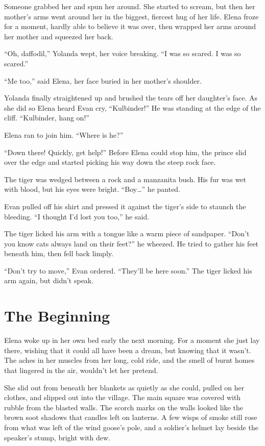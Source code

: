 \documentclass[10pt]{book}
\begin{document}
Someone grabbed her and spun her around. She started to scream, but then her mother's arms went around her in the biggest, fiercest hug of her life. Elena froze for a moment, hardly able to believe it was over, then wrapped her arms around her mother and squeezed her back.

``Oh, daffodil,'' Yolanda wept, her voice breaking. ``I was so scared. I was so scared.''

``Me too,'' said Elena, her face buried in her mother's shoulder.

Yolanda finally straightened up and brushed the tears off her daughter's face. As she did so Elena heard Evan cry, ``Kulbinder!'' He was standing at the edge of the cliff. ``Kulbinder, hang on!''

Elena ran to join him. ``Where is he?''

``Down there! Quickly, get help!'' Before Elena could stop him, the prince slid over the edge and started picking his way down the steep rock face.

The tiger was wedged between a rock and a manzanita bush. His fur was wet with blood, but his eyes were bright. ``Boy{\ldots}'' he panted.

Evan pulled off his shirt and pressed it against the tiger's side to staunch the bleeding. ``I thought I'd lost you too,'' he said.

The tiger licked his arm with a tongue like a warm piece of sandpaper. ``Don't you know cats always land on their feet?'' he wheezed. He tried to gather his feet beneath him, then fell back limply.

``Don't try to move,'' Evan ordered. ``They'll be here soon.'' The tiger licked his arm again, but didn't speak.

\chapter{The Beginning}

Elena woke up in her own bed early the next morning. For a moment she just lay there, wishing that it could all have been a dream, but knowing that it wasn't. The aches in her muscles from her long, cold ride, and the smell of burnt homes that lingered in the air, wouldn't let her pretend.

She slid out from beneath her blankets as quietly as she could, pulled on her clothes, and slipped out into the village. The main square was covered with rubble from the blasted walls. The scorch marks on the walls looked like the brown soot shadows that candles left on lanterns. A few wisps of smoke still rose from what was left of the wind goose's pole, and a soldier's helmet lay beside the speaker's stump, bright with dew.
\end{document}
